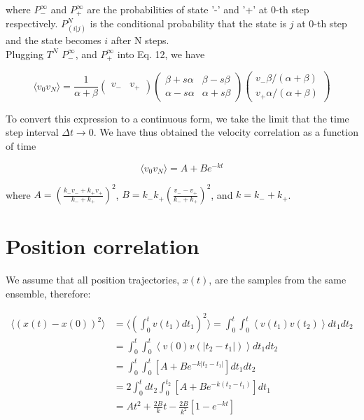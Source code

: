 \documentclass{article}
\begin{document}
where $P_-^{\infty}$ and $P_+^{\infty}$ are the probabilities of state '-' and '+' at 0-th step respectively. $P_{(i|j)}^N$ is the conditional probability that the state is $j$ at 0-th step and the state becomes $i$ after N steps. \\
Plugging $T^N$ $P_-^{\infty}$, and $P_+^{\infty}$ into Eq. 12, we have

\begin{equation}
    \langle v_0 v_N \rangle=
    \frac{1}{\alpha + \beta}
    \begin{pmatrix} v_- & v_+\end{pmatrix}
    \begin{pmatrix} 
        \beta + s \alpha & \beta - s \beta \\ \alpha - s \alpha & \alpha + s \beta 
    \end{pmatrix}
    \begin{pmatrix} 
        v_- \beta / (\alpha + \beta) \\
        v_+ \alpha / (\alpha + \beta)
    \end{pmatrix}
\end{equation}

To convert this expression to a continuous form, we take the limit that the time step interval $\Delta t \rightarrow 0$. We have thus obtained the velocity correlation as a function of time

\begin{equation}
    \langle v_0 v_N \rangle=A+Be^{-kt}
\end{equation}

where $A=(\frac{k_- v_- + k_+ v_+}{k_- + k_+})^2$, $B=k_- k_+ (\frac{v_- - v_+}{k_- + k_+})^2$, and $k=k_- + k_+$.

\section{Position correlation}

We assume that all position trajectories, $x(t)$, are the samples from the same ensemble, therefore:

\begin{equation}
    \begin{aligned}
    \langle (x(t) - x(0))^2 \rangle 
    &= \langle ( \int_0^t v(t_1) dt_1 )^2 \rangle  
    = \int_0^t \int_0^t \left\langle v(t_1) v(t_2) \right\rangle dt_1 dt_2 \\
    &= \int_0^t \int_0^t \left\langle v(0) v(|t_2 - t_1|) \right\rangle dt_1 dt_2 \\
    &= \int_0^t \int_0^t \left[ A + B e^{-k|t_2 - t_1|} \right] dt_1 dt_2 \\
    &= 2 \int_0^t dt_2 \int_0^{t_2} \left[ A + B e^{-k(t_2 - t_1)} \right] dt_1 \\
    &= At^2 + \frac{2B}{k} t - \frac{2B}{k^2} \left[ 1 - e^{-kt} \right] 
    \end{aligned}
\end{equation}
\end{document}
